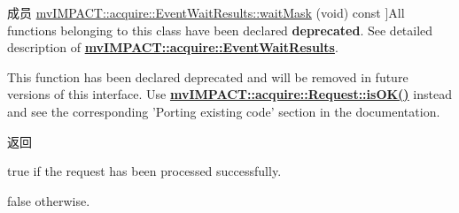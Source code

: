 \begin{DoxyRefList}
\hypertarget{deprecated__deprecated000026}{}%
成员 \hyperlink{classmv_i_m_p_a_c_t_1_1acquire_1_1_event_wait_results_a9a0ae92dc85c4daa39baeb7707446b69}{mv\+I\+M\+P\+A\+C\+T\+:\+:acquire\+:\+:Event\+Wait\+Results\+:\+:wait\+Mask} (void) const ]All functions belonging to this class have been declared {\bfseries deprecated}. See detailed description of {\bfseries \hyperlink{classmv_i_m_p_a_c_t_1_1acquire_1_1_event_wait_results}{mv\+I\+M\+P\+A\+C\+T\+::acquire\+::\+Event\+Wait\+Results}}.  
\item[\label{deprecated__deprecated000018}%
\hypertarget{deprecated__deprecated000018}{}%
成员 \hyperlink{classmv_i_m_p_a_c_t_1_1acquire_1_1_function_interface_ae494724c1e29e38f0e83e8a5f5793772}{mv\+I\+M\+P\+A\+C\+T\+:\+:acquire\+:\+:Function\+Interface\+:\+:M\+V\+I\+M\+P\+A\+C\+T\+\_\+\+D\+E\+P\+R\+E\+C\+A\+T\+E\+D\+\_\+\+C\+P\+P} (bool is\+Request\+O\+K(const Request $\ast$p) const )]This function has been declared deprecated and will be removed in future versions of this interface. Use {\bfseries \hyperlink{classmv_i_m_p_a_c_t_1_1acquire_1_1_request_a7120b640d76a3f8ed3711a8a773ad4be}{mv\+I\+M\+P\+A\+C\+T\+::acquire\+::\+Request\+::is\+O\+K()}} instead and see the corresponding 'Porting existing code' section in the documentation. \begin{DoxyReturn}{返回}

\begin{DoxyItemize}
\item true if the request has been processed successfully.
\item false otherwise.  
\end{DoxyItemize}
\end{DoxyReturn}


\end{DoxyRefList}
